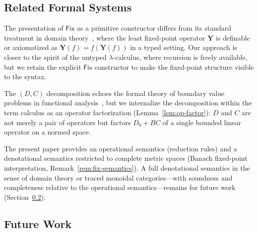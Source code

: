 \documentclass{lmcs}
\theoremstyle{plain}
\theoremstyle{definition}
\newcommand{\fix}{\mathsf{Fix}}
\begin{document}
\subsection{Related Formal Systems}

The presentation of $\fix$ as a primitive constructor differs from its
standard treatment in domain theory~\cite{scott1976,plotkin1977}, where the
least fixed-point operator $\mathbf{Y}$ is definable or axiomatized as
$\mathbf{Y}(f) = f(\mathbf{Y}(f))$ in a typed setting. Our approach is
closer to the spirit of the untyped $\lambda$-calculus, where recursion is
freely available, but we retain the explicit $\fix$ constructor to make the
fixed-point structure visible to the syntax.

The $(D, C)$ decomposition echoes the formal theory of boundary value
problems in functional analysis~\cite{stakgold1998}, but we internalize the
decomposition within the term calculus as an operator factorization
(Lemma~\ref{lem:op-factor}): $D$ and $C$ are not merely a pair of operators
but factors $D_0 + BC$ of a single bounded linear operator on a normed space.

The present paper provides an operational semantics (reduction rules) and a
denotational semantics restricted to complete metric spaces (Banach fixed-point
interpretation, Remark~\ref{rem:fix-semantics}). A full denotational semantics
in the sense of domain theory or traced monoidal categories---with soundness and
completeness relative to the operational semantics---remains for future work
(Section~\ref{sec:future}).

\subsection{Future Work}\label{sec:future}
\end{document}
